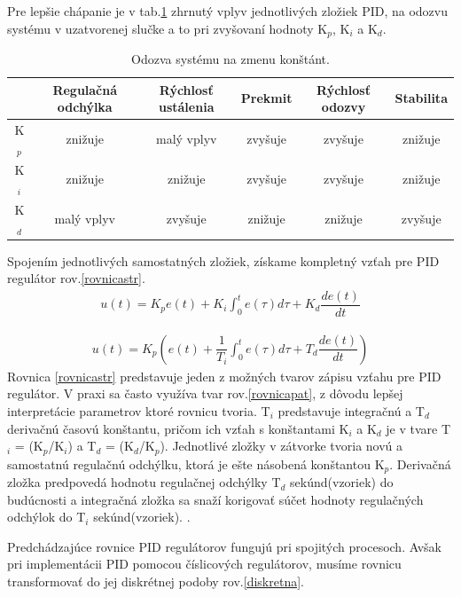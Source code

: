 Pre lepšie chápanie je v tab.\ref{PIDvplyv}\cite{pidcontrol} zhrnutý vplyv jednotlivých zložiek PID, na odozvu systému v uzatvorenej slučke a to pri zvyšovaní hodnoty K$_p$, K$_i$ a K$_d$. 

\begin{table}[!tbh]
	\begin{tabular}{|c|c|c|c|c|c|}
		\hline
		 & Regulačná odchýlka & Rýchlosť ustálenia & Prekmit & Rýchlosť odozvy & Stabilita \\ \hline
		K$_p$                    & znižuje            & malý vplyv         & zvyšuje      & zvyšuje         & znižuje           \\ \hline
		K$_i$                    & znižuje            & znižuje            & zvyšuje      & zvyšuje         & znižuje           \\ \hline
		K$_d$                    & malý vplyv         & zvyšuje            & znižuje      & znižuje         & zvyšuje           \\ \hline
	\end{tabular}
	\caption{Odozva systému na zmenu konštánt.}
	\label{PIDvplyv}
\end{table}

Spojením jednotlivých samostatných zložiek, získame kompletný vzťah pre PID regulátor rov.\ref{rovnicastr}.
\begin{align}
	\label{rovnicastr}
	u(t)=K_p e(t) + K_i  \int_{0}^{t} e(\tau)d\tau + K_d  \dfrac{de(t)}{dt}
\end{align}

\begin{align}
	\label{rovnicapat}
	u(t)=K_p \left(e(t) + \dfrac{1}{T_i}  \int_{0}^{t} e(\tau)d\tau + T_d  \dfrac{de(t)}{dt}\right)
\end{align}
Rovnica \ref{rovnicastr} predstavuje jeden z možných tvarov zápisu vzťahu pre PID regulátor. V praxi sa často využíva tvar rov.\ref{rovnicapat}, z dôvodu lepšej interpretácie parametrov ktoré rovnicu tvoria. T$_i$ predstavuje integračnú a T$_d$ derivačnú časovú konštantu, pričom ich vzťah s konštantami K$_i$ a K$_d$ je v tvare T$_i$ = (K$_p$/K$_i$) a T$_d$ = (K$_d$/K$_p$). Jednotlivé zložky v zátvorke tvoria novú a samostatnú regulačnú odchýlku, ktorá je ešte násobená konštantou K$_p$. Derivačná zložka predpovedá hodnotu regulačnej odchýlky T$_d$ sekúnd(vzoriek) do budúcnosti a integračná zložka sa snaží korigovať súčet hodnoty regulačných odchýlok do T$_i$ sekúnd(vzoriek)\cite{pidcontrol2}. \cite{PetkovZadek}.

Predchádzajúce rovnice PID regulátorov fungujú pri spojitých procesoch. Avšak pri implementácii PID pomocou číslicových regulátorov, musíme rovnicu transformovať do jej diskrétnej podoby rov.\ref{diskretna}.

